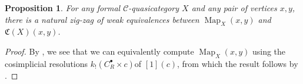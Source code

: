 \documentclass[leqno]{article}
\numberwithin{equation}{subsection}
\theoremstyle{plain}   %
\newtheorem{prop}[equation]{Proposition}
\theoremstyle{remark}
\theoremstyle{plain}
\newcommand{\overcat}[2]{{\left(#1\downarrow #2\right)}}
\DeclareMathOperator{\Map}{Map}
\providecommand{\C}{}
\renewcommand{\C}{\ensuremath{\mathcal{C}}}
\newcommand{\cellset}{\ensuremath{\widehat{\Theta[\mathcal{C}]}}}
\begin{document}
\begin{comment}
		\[F:\overcat{\mathcal{Y}(c)}{X_{x,y}} \hookrightarrow \overcat{\mathcal{Y}_f(c)}{X_{x,y}}\]
		sending \[Y(c)\to X_{x,y} \mapsto \mathscr{F}Y(c)\to \mathscr{F}(X) \to X.\]
		This works because
		\[\Map^\mathbf{sp}_{Y(c)}(\alpha,\omega)\to \Map^\mathbf{sp}_{\mathscr{F}(Y(c))}(\alpha,\omega)\]
		and
		\[\mathfrak{C}(Y(c))(\alpha,\omega)\to \mathfrak{C}(\mathscr{F}(Y(c)))(\alpha,\omega)\]
		are weak equivalences, in the first instance because the formation of the special mapping space was homotopy-invariant, 	and in the second instance because \(\mathfrak{C}\) is left-Quillen. Then we see that \(Fj\) and \(jF\) both admit 	natural transformations back to the appropriate identity functors, which proves that they induce a weak homotopy 	equivalence on nerves.

		The righthand vertical map comes from applying the nerve to the functor
		\[f:\overcat{\Delta}{\cellset_{\ast,\ast}(R^\bullet(c),X_{x,y})} \to \overcat{\mathcal{Y}_f(c)}{X_{x,y}}\]
		defined by the rule
		\[([n],R^n(c) \to X_{x,y}) \mapsto (R^n(c), R^n(c)\to X_{x,y}).\]
		To show that this functor induces a weak equivalence on nerves, we apply Quillen's theorem A.  Notice that for an object \	(y=(Y(c),Y(c)\to X_{x,y})\), the comma category \(\overcat{f}{y}\) is precisely
		\[\overcat{\Delta}{\mathcal{G}(c)(R^\bullet(c),Y(c))}=\overcat{\Delta}{\Map^\mathbf{sp}_{Y(c)}(\alpha,\omega)}.\]
		But by \cite{ds2}, the nerve of the category of elements of a simplicial set is weakly equivalent to that simplicial set, 	and since \(\Map^\mathbf{sp}_{Y(c)}(\alpha,\omega)\) was assumed to be contractible, the result follows.

		To see that the bottom map is an equivalence, it follows simply because \(C^\bullet(c) \to R^\bullet(c)\) is a Reedy 	trivial cofibration, so
		\[\cellset_{\ast,\ast}(R^\bullet(c),X_{x,y})  \to \cellset_{\ast,\ast}(C^\bullet(c),X_{x,y})\]
		is a weak equivalence.  Therefore, again by \cite{ds2}, the nerve of the category of elements of simplicial sets 	preserves weak equivalences.
	\end{proof}
\end{comment}
\begin{prop}\label{mapspacecomparison}
  For any formal \(\C\)-quasicategory \(X\) and any pair of vertices \(x,y\), there is a natural zig-zag of weak equivalences between \(\Map_X(x,y)\) and \(\mathfrak{C}(X)(x,y)\).
\end{prop}
\begin{proof}
	By , we see that we can equivalently compute \(\Map_X(x,y)\) using the cosimplicial resolutions \(k_!(C^\bullet_R\times c)\)of \([1](c)\), from which the result follows by .
\end{proof}
\end{document}
